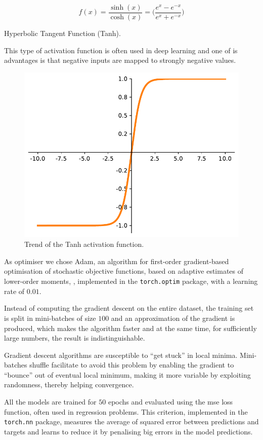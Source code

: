 \begin{Equation}[H]
	\centering
	\begin{equation}
	f(x)= \frac{\sinh (x)}{\cosh (x)} = \bigg( \frac{e^x - e^{-x}}{e^x + 
		e^{-x}}\bigg)
	\end{equation}
	\caption{Hyperbolic Tangent Function (Tanh).}
	\label{eq:tanh}
\end{Equation}

This type of activation function is often used in deep learning and one of is 
advantages is that negative inputs are mapped to strongly negative values.

\begin{figure}[htb]
	\centering
	\includegraphics[width=.5\textwidth]{contents/images/tanh2}%
	\caption{Trend of the Tanh activation function.}
	\label{fig:tanh}
\end{figure}

As optimiser we chose Adam, {an algorithm for first-order gradient-based 
optimisation of stochastic objective functions, based on adaptive estimates of 
lower-order moments}, \cite[see][]{kingma2014adam, 
loshchilov2017decoupled}, 
implemented in the \texttt{torch.optim} package, with a learning rate of $0.01$. 

Instead of computing the gradient descent on the entire dataset, the training set is 
split in mini-batches of size $100$ and an approximation of the gradient is 
produced, which makes the algorithm faster and at the same time, for sufficiently 
large numbers, the result is indistinguishable.

Gradient descent algorithms are susceptible to ``get stuck'' in local minima.
Mini-batches shuffle facilitate to avoid this problem by enabling the gradient to 
``bounce'' out of eventual local minimum, making it more variable by exploiting 
randomness, thereby helping convergence.

All the models are trained for $50$ epochs and evaluated using the \gls{mse} loss 
function, often used in regression problems. 
This criterion, implemented in the \texttt{torch.nn} package, measures the 
average of squared error between predictions and targets and learns to reduce it 
by penalising big errors in the model predictions.

